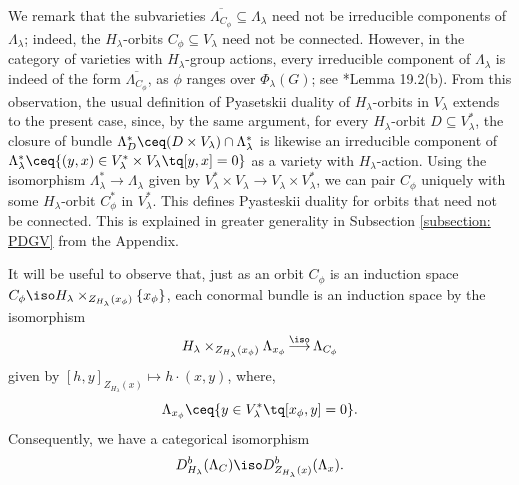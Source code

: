 \documentclass[11pt,letterpaper]{amsart}
\numberwithin{equation}{section}
\begin{document}
We remark that the subvarieties $\overline{\Lambda_{C_\phi}}\subseteq \Lambda_\lambda$ need not be irreducible components of $\Lambda_\lambda$; indeed, the $H_\lambda$-orbits $C_\phi \subseteq V_\lambda$ need not be connected.
However, in the category of varieties with $H_\lambda$-group actions, every irreducible component of $\Lambda_\lambda$ is indeed of the form  $\overline{\Lambda_{C_\phi}}$, as $\phi$ ranges over $\Phi_\lambda(G)$; see \cite{ABV92}*{Lemma 19.2(b)}. 
From this observation, the usual definition of Pyasetskii duality of $H_\lambda$-orbits in $V_\lambda$ extends to the present case, since, by the same argument, for every $H_\lambda$-orbit $D\subseteq V_\lambda^*$, the closure of bundle $\Lambda^*_{D} \ceq (D\times V_\lambda) \cap \Lambda^*_\lambda$ is likewise an irreducible  component of $\Lambda^*_\lambda \ceq \{ (y,x)\in V_\lambda^*\times V_\lambda \tq [y,x]=0 \}$ as a variety with $H_\lambda$-action. Using the isomorphism $\Lambda^*_\lambda \to \Lambda_\lambda$ given by $V^*_\lambda \times V_\lambda \to V_\lambda\times V^*_\lambda$, we can pair $C_\phi$ uniquely with some $H_\lambda$-orbit $C_\phi^*$ in $V^*_\lambda$. This defines Pyasteskii duality for orbits that need not be connected.
This is explained in greater generality in Subsection \ref{subsection: PDGV} from the Appendix.



It will be useful to observe that, just as an orbit $C_\phi$ is an induction space $C_\phi \iso H_{\lambda}\times_{Z_{H_\lambda}(x_\phi)}\{x_\phi\}$, each conormal bundle is an induction space by the isomorphism
\begin{equation}\label{equation: induction space}
H_\lambda \times_{Z_{H_\lambda}(x_\phi)} \Lambda_{x_\phi} \mathop{\longrightarrow}\limits^{\iso} \Lambda_{C_\phi}  
\end{equation}
given by $[h,y]_{Z_{H_\lambda}(x)} \mapsto h\cdot(x,y)$, where,
\[
\Lambda_{x_\phi} \ceq \{ y\in V_\lambda^* \tq [x_\phi,y] =0 \}.
\]
Consequently, we have a categorical isomorphism
\[
D^b_{H_\lambda}(\Lambda_C) \iso D^b_{Z_{H_\lambda}(x)}(\Lambda_x).
\]
\end{document}
